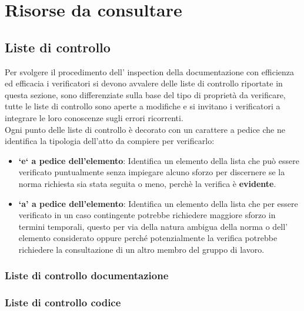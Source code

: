 \section{Risorse da consultare}
	\subsection{Liste di controllo}
		Per svolgere il procedimento dell’ inspection della documentazione con efficienza ed efficacia i verificatori si devono avvalere delle liste di controllo riportate in questa sezione, sono differenziate sulla base del tipo di proprietà da verificare, tutte le liste di controllo sono aperte a modifiche e si invitano i verificatori a integrare le loro conoscenze sugli errori ricorrenti.\\
		Ogni punto delle liste di controllo è decorato con un carattere a pedice che ne identifica la tipologia dell’atto da compiere per verificarlo:\\
		\begin{itemize}
			\item\textbf{‘e‘ a pedice dell’elemento}: Identifica un elemento della lista che può essere verificato puntualmente senza impiegare alcuno sforzo per discernere se la norma richiesta sia stata seguita o meno, perchè la verifica è \textbf{evidente}.
			 \item\textbf{‘a’ a pedice dell’elemento}: Identifica un elemento della lista che per essere verificato in un caso contingente potrebbe richiedere maggiore sforzo in termini temporali, questo per via della natura ambigua della norma o dell’ elemento considerato oppure perché potenzialmente la verifica potrebbe richiedere la consultazione di un altro membro del gruppo di lavoro.
		\end{itemize}
		\subsubsection{Liste di controllo documentazione}
		\subsubsection{Liste di controllo codice}
			
